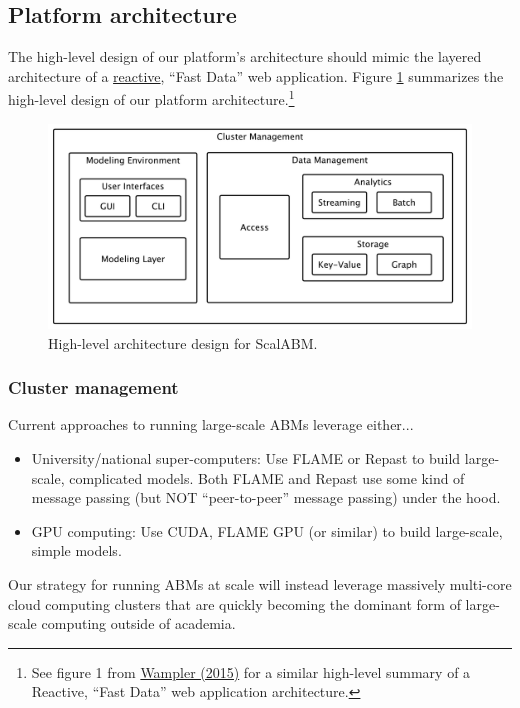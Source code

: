 \documentclass[11pt]{amsart}
\begin{document}
\subsection{Platform architecture}
The high-level design of our platform's architecture should mimic the layered architecture of a \href{http://www.reactivemanifesto.org/}{reactive}, ``Fast Data'' web application. Figure \ref{img-figure1} summarizes the high-level design of our platform architecture.\footnote{
%
See figure 1 from \href{./fast-data-big-data-evolved.pdf}{Wampler (2015)} for a similar high-level summary of a Reactive, ``Fast Data'' web application architecture.
%
}
\begin{figure}[H]\label{img-figure1}
\centering
\includegraphics[width=12cm]{img/coarse-grain-schema.pdf}
\caption{High-level architecture design for ScalABM.}
\end{figure}

\subsubsection{Cluster management} 
Current approaches to running large-scale ABMs leverage either...
\begin{itemize}
    \item University/national super-computers: Use FLAME or Repast to build large-scale, complicated models. Both FLAME and Repast use some kind of message passing (but NOT ``peer-to-peer'' message passing) under the hood.
    \item GPU computing: Use CUDA, FLAME GPU (or similar) to build large-scale, simple models.
\end{itemize}
Our strategy for running ABMs at scale will instead leverage massively multi-core cloud computing clusters that are quickly becoming the dominant form of large-scale computing outside of academia.
\end{document}
